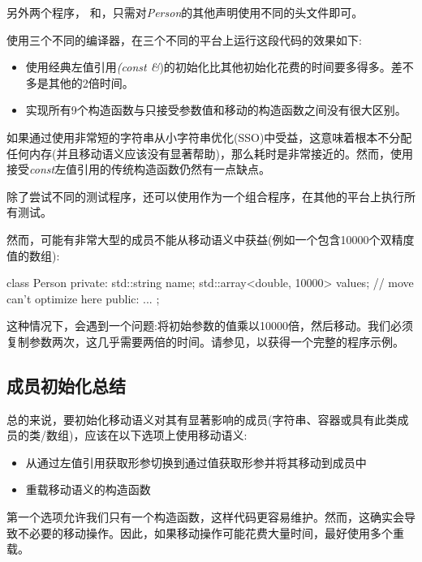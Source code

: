另外两个程序， 和，只需对\textit{Person}的其他声明使用不同的头文件即可。

使用三个不同的编译器，在三个不同的平台上运行这段代码的效果如下:

\begin{itemize}
	\item 使用经典左值引用\textit{(const \&})的初始化比其他初始化花费的时间要多得多。差不多是其他的2倍时间。
	\item 实现所有9个构造函数与只接受参数值和移动的构造函数之间没有很大区别。
\end{itemize}

如果通过使用非常短的字符串从小字符串优化(SSO)中受益，这意味着根本不分配任何内存(并且移动语义应该没有显著帮助)，那么耗时是非常接近的。然而，使用接受\textit{const}左值引用的传统构造函数仍然有一点缺点。

除了尝试不同的测试程序，还可以使用作为一个组合程序，在其他的平台上执行所有测试。

然而，可能有非常大型的成员不能从移动语义中获益(例如一个包含10000个双精度值的数组):

\begin{cppcode}
class Person {
private:
	std::string name;
	std::array<double, 10000> values; // move can’t optimize here
public:
	...
};
\end{cppcode}

这种情况下，会遇到一个问题:将初始参数的值乘以10000倍，然后移动。我们必须复制参数两次，这几乎需要两倍的时间。请参见，以获得一个完整的程序示例。

\subsection{成员初始化总结}

总的来说，要初始化移动语义对其有显著影响的成员(字符串、容器或具有此类成员的类/数组)，应该在以下选项上使用移动语义:

\begin{itemize}
	\item 从通过左值引用获取形参切换到通过值获取形参并将其移动到成员中
	\item 重载移动语义的构造函数
\end{itemize}

第一个选项允许我们只有一个构造函数，这样代码更容易维护。然而，这确实会导致不必要的移动操作。因此，如果移动操作可能花费大量时间，最好使用多个重载。


